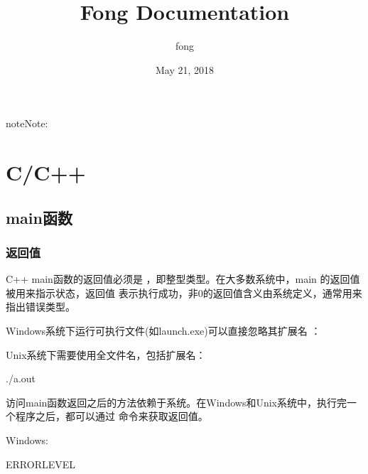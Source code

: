 \documentclass[letterpaper,10pt,english]{sphinxmanual}
\title{Fong Documentation}
\date{May 21, 2018}
\author{fong}
\begin{document}
\maketitle
\sphinxtableofcontents
{}\label{\detokenize{index::doc}}


\begin{sphinxadmonition}{note}{Note:}
\end{sphinxadmonition}


\chapter{C/C++}
\label{\detokenize{cpp/index:c-c}}\label{\detokenize{cpp/index::doc}}\label{\detokenize{cpp/index:id1}}

\section{main函数}
\label{\detokenize{cpp/01_main:main}}\label{\detokenize{cpp/01_main::doc}}

\subsection{返回值}
\label{\detokenize{cpp/01_main:id1}}
C++ main函数的返回值必须是  ，即整型类型。在大多数系统中，main 的返回值被用来指示状态，返回值  表示执行成功，非0的返回值含义由系统定义，通常用来指出错误类型。

Windows系统下运行可执行文件(如launch.exe)可以直接忽略其扩展名  ：

%
\begin{sphinxVerbatim}[commandchars=\\\{\}]
\end{sphinxVerbatim}

Unix系统下需要使用全文件名，包括扩展名：

%
\begin{sphinxVerbatim}[commandchars=\\\{\}]
./a.out
\end{sphinxVerbatim}

访问main函数返回之后的方法依赖于系统。在Windows和Unix系统中，执行完一个程序之后，都可以通过  命令来获取返回值。

Windows:

%
\begin{sphinxVerbatim}[commandchars=\\\{\}]
 \PYGZpc{}ERRORLEVEL\PYGZpc{}
\end{sphinxVerbatim}
\end{document}
